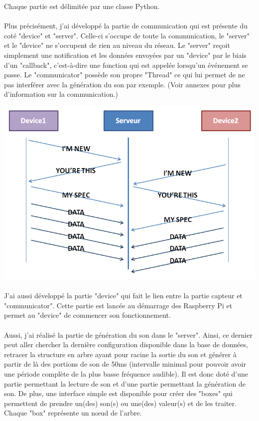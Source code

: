 \documentclass[12pt]{article}
\begin{document}
	Chaque partie est délimitée par une classe Python.
	
	\paragraph{}
	Plus précisément, j'ai développé la partie de communication qui est présente du coté "device" et "server". Celle-ci s'occupe de toute la communication, le "server" et le "device" ne s'occupent de rien au niveau du réseau. Le "server" reçoit simplement une notification et les données envoyées par un "device" par le biais d'un "callback", c'est-à-dire une fonction qui est appelée lorsqu'un événement se passe. Le "communicator" possède son propre "Thread" ce qui lui permet de ne pas interférer avec la génération du son par exemple. (Voir annexes pour plus d'information sur la communication.)
	
	\vspace{1cm}
	\noindent
	\includegraphics[width=\textwidth]{communication_example}
	\vspace{1cm}
	
	\paragraph{}
	J'ai aussi développé la partie "device" qui fait le lien entre la partie capteur et "communicator". Cette partie est lancée au démarrage des Raspberry Pi et permet au "device" de commencer son fonctionnement.
	
	\paragraph{}
	Aussi, j'ai réalisé la partie de génération du son dans le "server". Ainsi, ce dernier peut aller chercher la dernière configuration disponible dans la base de données, retracer la structure en arbre ayant pour racine la sortie du son et générer à partir de là des portions de son de 50ms (intervalle minimal pour pouvoir avoir une période complète de la plus basse fréquence audible). Il est donc doté d'une partie permettant la lecture de son et d'une partie permettant la génération de son. De plus, une interface simple est disponible pour créer des "boxes" qui permettent de prendre un(des) son(s) ou une(des) valeur(s) et de les traiter. Chaque "box" représente un nœud de l'arbre.
	
\end{document}
